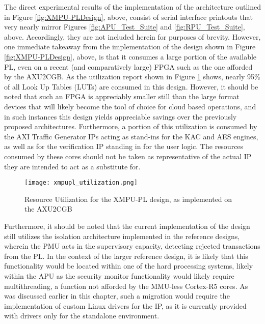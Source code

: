 The direct experimental results of the implementation of the architecture outlined in Figure \ref{fig:XMPU-PLDesign}, above, consist of serial interface printouts that very nearly mirror Figures \ref{fig:APU_Test_Suite} and \ref{fig:RPU_Test_Suite}, above. Accordingly, they are not included herein for purposes of brevity. However, one immediate takeaway from the implementation of the design shown in Figure \ref{fig:XMPU-PLDesign}, above, is that it consumes a large portion of the available PL, even on a recent (and comparatively large) FPGA such as the one afforded by the AXU2CGB. As the utilization report shown in Figure \ref{fig:XMPU-PLUtilization} shows, nearly 95\% of all Look Up Tables (LUTs) are consumed in this design. However, it should be noted that such an FPGA is appreciably smaller still than the large format devices that will likely become the tool of choice for cloud based operations, and in such instances this design yields appreciable savings over the previously proposed architectures. Furthermore, a portion of this utilization is consumed by the AXI Traffic Generator IPs acting as stand-ins for the KAC and AES engines, as well as for the verification IP standing in for the user logic. The resources consumed by these cores should not be taken as representative of the actual IP they are intended to act as a substitute for.

\begin{figure}
    \centering
    \texttt{[image: xmpupl\_utilization.png]}
    \caption[Memory Isolation Resource Utilization]{Resource Utilization for the XMPU-PL design, as implemented on the AXU2CGB}
    \label{fig:XMPU-PLUtilization}
\end{figure}

Furthermore, it should be noted that the current implementation of the design still utilizes the isolation architecture implemented in the reference designs, wherein the PMU acts in the supervisory capacity, detecting rejected transactions from the PL. In the context of the larger reference design, it is likely that this functionality would be located within one of the hard processing systems, likely within the APU as the security monitor functionality would likely require multithreading, a function not afforded by the MMU-less Cortex-R5 cores. As was discussed earlier in this chapter, such a migration would require the implementation of custom Linux drivers for the IP, as it is currently provided with drivers only for the standalone environment.